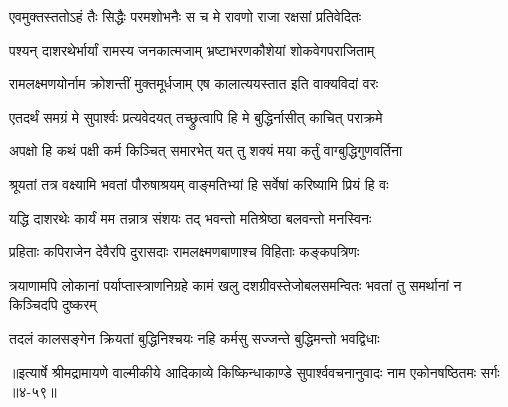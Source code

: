 \twolineshloka
{एवमुक्तस्ततोऽहं तैः सिद्धैः परमशोभनैः}
{स च मे रावणो राजा रक्षसां प्रतिवेदितः} %

\twolineshloka
{पश्यन् दाशरथेर्भार्यां रामस्य जनकात्मजाम्}
{भ्रष्टाभरणकौशेयां शोकवेगपराजिताम्} %

\twolineshloka
{रामलक्ष्मणयोर्नाम क्रोशन्तीं मुक्तमूर्धजाम्}
{एष कालात्ययस्तात इति वाक्यविदां वरः} %

\twolineshloka
{एतदर्थं समग्रं मे सुपार्श्वः प्रत्यवेदयत्}
{तच्छ्रुत्वापि हि मे बुद्धिर्नासीत् काचित् पराक्रमे} %

\twolineshloka
{अपक्षो हि कथं पक्षी कर्म किञ्चित् समारभेत्}
{यत् तु शक्यं मया कर्तुं वाग्बुद्धिगुणवर्तिना} %

\twolineshloka
{श्रूयतां तत्र वक्ष्यामि भवतां पौरुषाश्रयम्}
{वाङ्मतिभ्यां हि सर्वेषां करिष्यामि प्रियं हि वः} %

\twolineshloka
{यद्धि दाशरथेः कार्यं मम तन्नात्र संशयः}
{तद् भवन्तो मतिश्रेष्ठा बलवन्तो मनस्विनः} %

\twolineshloka
{प्रहिताः कपिराजेन देवैरपि दुरासदाः}
{रामलक्ष्मणबाणाश्च विहिताः कङ्कपत्रिणः} %

\threelineshloka
{त्रयाणामपि लोकानां पर्याप्तास्त्राणनिग्रहे}
{कामं खलु दशग्रीवस्तेजोबलसमन्वितः}
{भवतां तु समर्थानां न किञ्चिदपि दुष्करम्} %

\twolineshloka
{तदलं कालसङ्गेन क्रियतां बुद्धिनिश्चयः}
{नहि कर्मसु सज्जन्ते बुद्धिमन्तो भवद्विधाः} %


॥इत्यार्षे श्रीमद्रामायणे वाल्मीकीये आदिकाव्ये किष्किन्धाकाण्डे सुपार्श्ववचनानुवादः नाम एकोनषष्ठितमः सर्गः ॥४-५९॥
